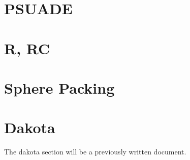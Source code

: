 

\maketitle
\tableofcontents

\newpage

\section{PSUADE}















\newpage

\section{R, RC}



\section{Sphere Packing}



\section{Dakota}

The dakota section will be a previously written document.




